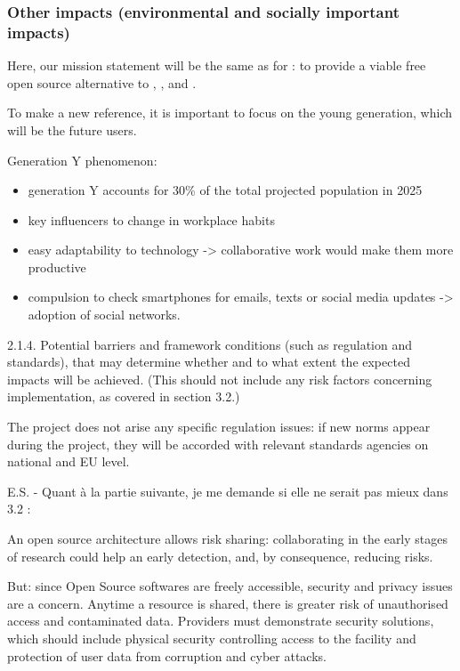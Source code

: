 \subsubsection{Other impacts (environmental and socially important impacts)}

Here, our mission statement will be the same as for \Sage: to provide
a viable free open source alternative to \Magma, \Maple, \Mathematica
and \Matlab.

To make \TheProject a new reference, it is important to focus on the young
generation, which will be the future users.

Generation Y phenomenon:

\begin{itemize}
\item generation Y accounts for 30\% of the total projected population
in 2025
\item key influencers to change in workplace habits
\item easy adaptability to technology -{\textgreater} collaborative work
would make them more productive
\item compulsion to check smartphones for emails, texts or social media
updates -{\textgreater} adoption of social networks.
\end{itemize}
2.1.4. Potential barriers and framework conditions (such as regulation
and standards), that may determine whether and to what extent the
expected impacts will be achieved. (This should not include any risk
factors concerning implementation, as covered in section 3.2.)

The project does not arise any specific regulation issues: if new norms
appear during the project, they will be accorded with relevant
standards agencies on national and EU level.

E.S. - Quant à la partie suivante, je me demande si elle ne serait pas
mieux dans 3.2 :

An open source architecture allows risk sharing: collaborating in the
early stages of research could help an early detection, and, by
consequence, reducing risks.

But:  since Open Source softwares are freely accessible, security and
privacy issues are a concern. Anytime a resource is shared, there is
greater risk of unauthorised access and contaminated data.  Providers
must demonstrate security solutions, which should include physical
security controlling access to the facility and protection of user data
from corruption and cyber attacks.




